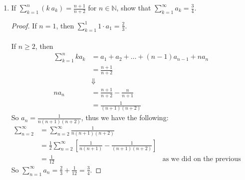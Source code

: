 \documentclass[12pt,letterpaper]{article}
\newcommand{\N}{\mathbb{N}}
\theoremstyle{case}
\theoremstyle{definition}
\begin{document}
\begin{enumerate}
\begin{enumerate}
			\item If $\displaystyle\sum_{k=1}^{n} (k\ a_k)=\frac{n+1}{n+2}$ for $n \in \N$, show that $\displaystyle\sum_{k=1}^{\infty} a_k=\frac{3}{4}$.
			\begin{proof}
				If $n=1$, then $\displaystyle\sum_{k=1}^{1} 1\cdot a_1 = \frac{2}{3}$. 
				\\\\If $n \geq 2$, then
				\begin{align*}
					\sum_{k=1}^{n} ka_k &= a_1+a_2+\dots+(n-1)a_{n-1}+na_n \\
					&= \frac{n+1}{n+2} \\
					&\Downarrow \\
					na_n &= \frac{n+1}{n+2} - \frac{n}{n+1} \\
					&= \frac{1}{(n+1)(n+2)}
				\end{align*}
				So $a_n=\frac{1}{n(n+1)(n+2)}$, thus we have the following:
				\begin{align*}
					\sum_{n=2}^{\infty} &= \sum_{n=2}^{\infty} \frac{1}{n(n+1)(n+2)} \\
					&= \frac{1}{2} \sum_{n=2}^{\infty} \left[\frac{1}{n(n+1)}-\frac{1}{(n+1)(n+2)}\right] \\
					&= \frac{1}{12} &\text{as we did on the previous homework}
				\end{align*}
				So $\displaystyle\sum_{n=1}^{\infty} a_n=\frac{2}{3}+\frac{1}{12} = \frac{3}{4}$.
			\end{proof}
		\end{enumerate}
	\end{enumerate}
\end{document}
